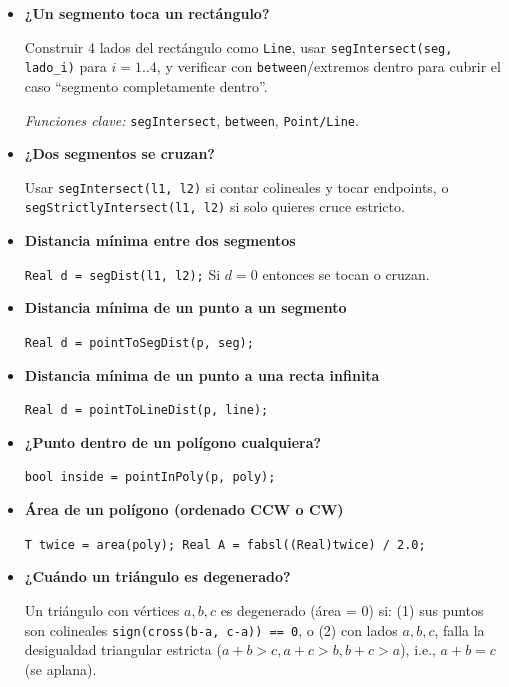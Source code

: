 \begin{itemize}
    \item \textbf{¿Un segmento toca un rectángulo?}
    
    Construir 4 lados del rectángulo como \texttt{Line}, usar \texttt{segIntersect(seg, lado\_i)} para $i = 1..4$, y verificar con \texttt{between}/extremos dentro para cubrir el caso ``segmento completamente dentro''.
    
    \textit{Funciones clave:} \texttt{segIntersect}, \texttt{between}, \texttt{Point/Line}.
    
    \item \textbf{¿Dos segmentos se cruzan?}
    
    Usar \texttt{segIntersect(l1, l2)} si contar colineales y tocar endpoints, o \texttt{segStrictlyIntersect(l1, l2)} si solo quieres cruce estricto.
    
    \item \textbf{Distancia mínima entre dos segmentos}
    
    \texttt{Real d = segDist(l1, l2);} Si $d = 0$ entonces se tocan o cruzan.
    
    \item \textbf{Distancia mínima de un punto a un segmento}
    
    \texttt{Real d = pointToSegDist(p, seg);}
    
    \item \textbf{Distancia mínima de un punto a una recta infinita}
    
    \texttt{Real d = pointToLineDist(p, line);}
    
    \item \textbf{¿Punto dentro de un polígono cualquiera?}
    
    \texttt{bool inside = pointInPoly(p, poly);}
    
    \item \textbf{Área de un polígono (ordenado CCW o CW)}
    
    \texttt{T twice = area(poly); Real A = fabsl((Real)twice) / 2.0;}
    
    \item \textbf{¿Cuándo un triángulo es degenerado?}
    
    Un triángulo con vértices $a, b, c$ es degenerado (área = 0) si: (1) sus puntos son colineales \texttt{sign(cross(b-a, c-a)) == 0}, o (2) con lados $a, b, c$, falla la desigualdad triangular estricta ($a+b > c, a+c > b, b+c > a$), i.e., $a+b = c$ (se aplana).
    

\end{itemize}
